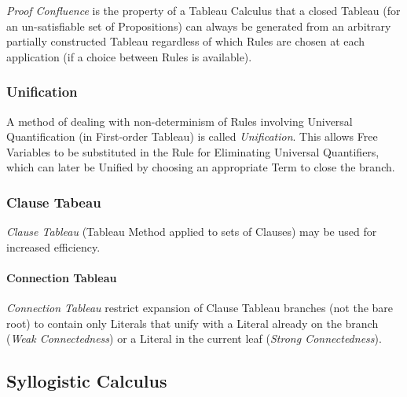 \emph{Proof Confluence} is the property of a Tableau Calculus that a
closed Tableau (for an un-satisfiable set of Propositions) can always
be generated from an arbitrary partially constructed Tableau
regardless of which Rules are chosen at each application (if a choice
between Rules is available).



\subsubsection{Unification} \label{sec:tableau_unification}

A method of dealing with non-determinism of Rules involving Universal
Quantification (in First-order Tableau) is called \emph{Unification}.
This allows Free Variables to be substituted in the Rule for
Eliminating Universal Quantifiers, which can later be Unified by
choosing an appropriate Term to close the branch.



\subsubsection{Clause Tabeau} \label{sec:clause_tableau}

\emph{Clause Tableau} (Tableau Method applied to sets of Clauses) may
be used for increased efficiency.



\paragraph{Connection Tableau} \label{sec:connection_tableau}\hfill

\emph{Connection Tableau} restrict expansion of Clause Tableau
branches (not the bare root) to contain only Literals that unify with
a Literal already on the branch (\emph{Weak Connectedness}) or a
Literal in the current leaf (\emph{Strong Connectedness}).



\subsection{Syllogistic Calculus} \label{sec:syllogistic_calculus}



